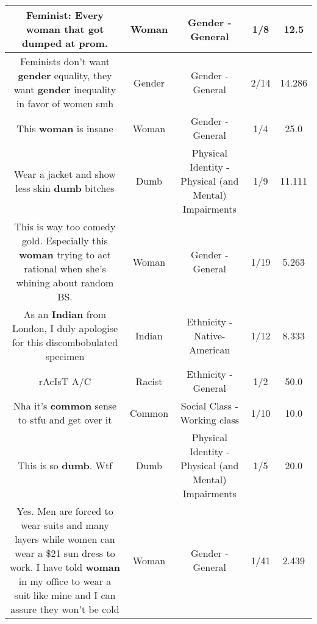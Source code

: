\documentclass[11pt]{article}
\newlength\mylength
\begin{document}
\begin{center}
\begin{longtable}{|C{.65\mylength}|C{.30\mylength}|C{.12\mylength}|C{.12\mylength}|C{.12\mylength}|}
  \small Feminist: Every \textbf{woman} that got dumped at prom.\normalsize   & Woman & Gender - General & 1/8 & 12.5 \\  \hline
  \small Feminists don't want \textbf{gender} equality, they want \textbf{gender} inequality in favor of women smh\normalsize   & Gender & Gender - General & 2/14 & 14.286 \\  \hline
  \small This \textbf{woman} is insane\normalsize   & Woman & Gender - General & 1/4 & 25.0 \\  \hline
  \small Wear a jacket and show less skin \textbf{dumb} bitches\normalsize   & Dumb & Physical Identity - Physical (and Mental) Impairments & 1/9 & 11.111 \\  \hline
  \small This is way too comedy gold. Especially this \textbf{woman} trying to act rational when she's whining about random BS.\normalsize   & Woman & Gender - General & 1/19 & 5.263 \\  \hline
  \small As an \textbf{Indian} from London, I duly apologise for this discombobulated specimen\normalsize   & Indian & Ethnicity - Native-American & 1/12 & 8.333 \\  \hline
  \small rAcIsT A/C\normalsize   & Racist & Ethnicity - General & 1/2 & 50.0 \\  \hline
  \small Nha it's \textbf{common} sense to stfu and get over it\normalsize   & Common & Social Class - Working class & 1/10 & 10.0 \\  \hline
  \small This is so \textbf{dumb}. Wtf\normalsize   & Dumb & Physical Identity - Physical (and Mental) Impairments & 1/5 & 20.0 \\  \hline
  \small Yes.  Men are forced to wear suits and many layers while women can wear a \$21 sun dress to work.  I have told \textbf{woman} in my office to wear a suit like mine and I can assure they won't be cold\normalsize   & Woman & Gender - General & 1/41 & 2.439 \\  \hline

\end{longtable}
\end{center}
\end{document}
